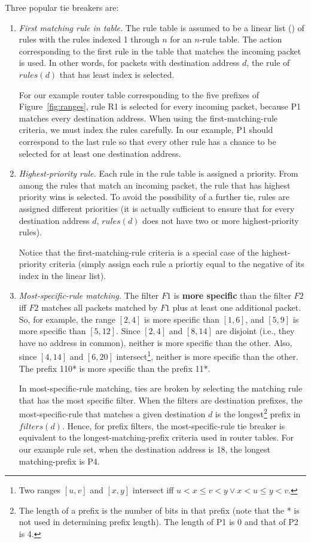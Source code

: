 Three popular tie breakers are:
\begin{enumerate}
\item
{\em First matching rule in table.}
The rule table is assumed to be a linear
list (\cite{horo1}) of rules with the rules indexed 1 through $n$ for an $n$-rule table.
The action corresponding to the first rule in the table that matches the
incoming packet is used. In other words, for packets with destination
address $d$, the rule of $rules(d)$ that has least
index is selected.

For our example router table corresponding to the
five prefixes of
Figure~\ref{fig:ranges}, rule R1 is selected for every incoming packet, because
P1 matches every destination address. When using the first-matching-rule
criteria, we must index the rules carefully. In our example,
P1 should correspond to the last rule so that every other rule has a chance to
be selected for at least one destination address.
\item
{\em Highest-priority rule.}
Each rule in the rule table is assigned a priority. From among the rules that
match an incoming packet, the rule that has
highest priority wins is selected. To avoid the possibility of a further tie,
rules
are assigned different priorities (it is actually sufficient to ensure that for
every destination address $d$, $rules(d)$ does not have two or more
highest-priority rules).

Notice that the first-matching-rule
criteria is a special case of the highest-priority criteria (simply
assign each rule a priortiy equal to the negative of
its index in the linear list).
\item
{\em Most-specific-rule matching.}
The filter $F1$ is {\bf more specific} than the filter $F2$ iff
$F2$ matches all packets matched by $F1$ plus at least one additional
packet.
So, for example, the range
$[2,4]$ is more specific than $[1,6]$, and $[5,9]$ is more specific than
$[5,12]$. Since $[2,4]$ and $[8,14]$ are disjoint (i.e., they have no
address in common), neither is more specific
than the other. Also, since $[4,14]$ and $[6,20]$ intersect\footnote{Two
ranges $[u,v]$ and $[x,y]$ intersect iff
$u <  x \leq v < y \vee
x < u \leq y < v$.},
neither
is more specific than the other.
The prefix 110* is more specific than the prefix 11*.

In most-specific-rule matching, ties are broken by selecting the
matching rule that has the most specific filter.
When the filters are destination prefixes, the most-specific-rule
that matches a given destination $d$ is the longest\footnote{The
length of a prefix is the number of bits in that prefix (note that the *
is not used in determining prefix length). The length of P1 is 0 and that
of P2 is 4.}
prefix in
$filters(d)$.
Hence, for prefix filters, the most-specific-rule tie breaker
is equivalent to the longest-matching-prefix criteria used in router tables.
For our example rule set, when the destination
address is 18, the longest matching-prefix is P4.



\end{enumerate}
